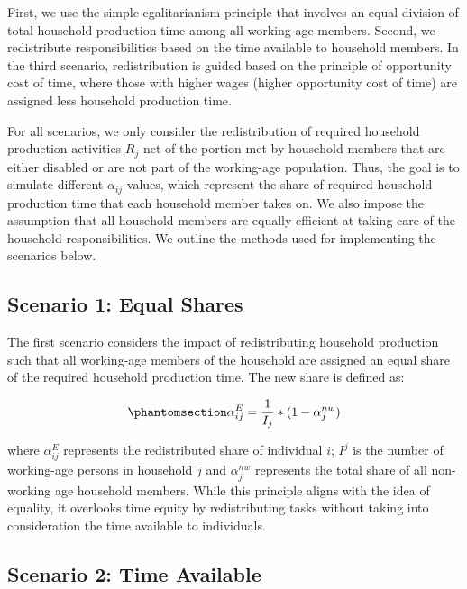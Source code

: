 \documentclass[
  11pt,
]{article}
\begin{document}
First, we use the simple egalitarianism principle that involves an equal
division of total household production time among all working-age
members. Second, we redistribute responsibilities based on the time
available to household members. In the third scenario, redistribution is
guided based on the principle of opportunity cost of time, where those
with higher wages (higher opportunity cost of time) are assigned less
household production time.

For all scenarios, we only consider the redistribution of required
household production activities \(R_j\) net of the portion met by
household members that are either disabled or are not part of the
working-age population. Thus, the goal is to simulate different
\(\alpha_{ij}\) values, which represent the share of required household
production time that each household member takes on. We also impose the
assumption that all household members are equally efficient at taking
care of the household responsibilities. We outline the methods used for
implementing the scenarios below.

\subsection{Scenario 1: Equal Shares}\label{scenario-1-equal-shares}

The first scenario considers the impact of redistributing household
production such that all working-age members of the household are
assigned an equal share of the required household production time. The
new share is defined as:

\begin{equation}\phantomsection\label{eq-r1}{\alpha_{ij}^E= \frac{1}{I_j}*(1-\alpha_{j}^{nw})
}\end{equation}

where \(\alpha_{ij}^E\) represents the redistributed share of individual
\(i\); \(I^j\) is the number of working-age persons in household \(j\)
and \(\alpha_{j}^{nw}\) represents the total share of all non-working
age household members. While this principle aligns with the idea of
equality, it overlooks time equity by redistributing tasks without
taking into consideration the time available to individuals.

\subsection{Scenario 2: Time Available}\label{scenario-2-time-available}
\end{document}
